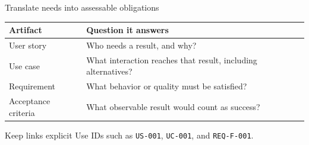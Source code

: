 \begin{frame}{Translate needs into assessable obligations}
\small
\begin{tabular}{@{}p{}p{}@{}}
\toprule
Artifact & Question it answers \\
\midrule
User story & Who needs a result, and why? \\
Use case & What interaction reaches that result, including alternatives? \\
Requirement & What behavior or quality must be satisfied? \\
Acceptance criteria & What observable result would count as success? \\
\bottomrule
\end{tabular}
\vspace{0.3cm}
\begin{slidecallout}{Keep links explicit}
Use IDs such as \texttt{US-001}, \texttt{UC-001}, and \texttt{REQ-F-001}.
\end{slidecallout}
\end{frame}
